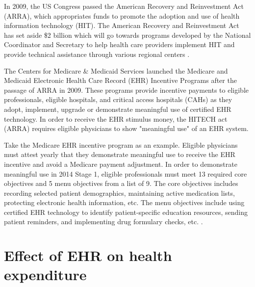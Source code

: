 \documentclass[12pt]{report}
\begin{document}
In 2009, the US Congress passed the American Recovery and Reinvestment Act (ARRA), which appropriates funds to promote the adoption and use of health information technology (HIT). The American Recovery and Reinvestment Act has set aside \$2 billion which will go towards programs developed by the National Coordinator and Secretary to help health care providers implement HIT and provide technical assistance through various regional centers \citep{hhs_recovery}.

The Centers for Medicare \& Medicaid Services launched the Medicare and Medicaid Electronic Health Care Record (EHR) Incentive Programs after the passage of ARRA in 2009. These programs provide incentive payments to eligible professionals, eligible hospitals, and critical access hospitals (CAHs) as they adopt, implement, upgrade or demonstrate meaningful use of certified EHR technology. In order to receive the EHR stimulus money, the HITECH act (ARRA) requires eligible physicians to show "meaningful use" of an EHR system.

Take the Medicare EHR incentive program as an example. Eligible physicians must attest yearly that they demonstrate meaningful use to receive the EHR incentive and avoid a Medicare payment adjustment. In order to demonstrate meaningful use in 2014 Stage 1, eligible professionals must meet 13 required core objectives and 5 menu objectives from a list of 9. The core objectives includes recording selected patient demographics, maintaining active medication lists, protecting electronic health information, etc. The menu objectives include using certified EHR technology to identify patient-specific education resources, sending patient reminders, and implementing drug formulary checks, etc. \citep{stage1}.

\section{Effect of EHR on health expenditure}
\end{document}
